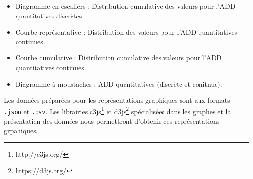 \begin{enumerate}
\begin{itemize}
						\item Diagramme en escaliers : Distribution cumulative des valeurs pour l'ADD quantitatives discrètes.
						\item Courbe représentative : Distribution des valeurs pour l'ADD quantitatives continues.
						\item Courbe cumulative : Distribution cumulative des valeurs pour l'ADD quantitatives continues.
						\item Diagramme à moustaches : ADD quantitatives (discrète et conitnue).
					\end{itemize}
					Les données préparées pour les représentations graphiques sont aux formats \lstinline!.json! et \lstinline!.csv!. Les librairies c3js\footnote{http://c3js.org/} et d3js\footnote{https://d3js.org/} spécialisées dans les graphes et la présentation des données nous permettront d'obtenir ces représentations grpahiques.
			\end{enumerate}
	

